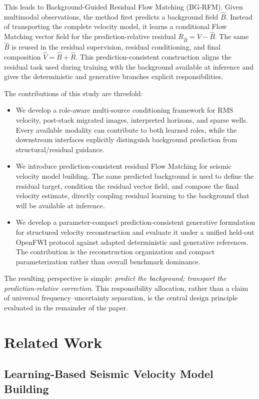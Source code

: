 \documentclass[remotesensing,article,submit,pdftex,moreauthors]{Definitions/mdpi}
\newcommand{\method}{BG-RFM}
\begin{document}
This leads to Background-Guided Residual Flow Matching (\method). Given multimodal observations, the method first predicts a background field $\hat B$. Instead of transporting the complete velocity model, it learns a conditional Flow Matching vector field for the prediction-relative residual $R_{\hat B}=V-\hat B$. The same $\hat B$ is reused in the residual supervision, residual conditioning, and final composition $\hat V=\hat B+\hat R$. This prediction-consistent construction aligns the residual task used during training with the background available at inference and gives the deterministic and generative branches explicit responsibilities.

The contributions of this study are threefold:
\begin{itemize}
    \item We develop a role-aware multi-source conditioning framework for RMS velocity, post-stack migrated images, interpreted horizons, and sparse wells. Every available modality can contribute to both learned roles, while the downstream interfaces explicitly distinguish background prediction from structural/residual guidance.
    \item We introduce prediction-consistent residual Flow Matching for seismic velocity model building. The same predicted background is used to define the residual target, condition the residual vector field, and compose the final velocity estimate, directly coupling residual learning to the background that will be available at inference.
    \item We develop a parameter-compact prediction-consistent generative formulation for structured velocity reconstruction and evaluate it under a unified held-out OpenFWI protocol against adapted deterministic and generative references. The contribution is the reconstruction organization and compact parameterization rather than overall benchmark dominance.
\end{itemize}

The resulting perspective is simple: \emph{predict the background; transport the prediction-relative correction}. This responsibility allocation, rather than a claim of universal frequency--uncertainty separation, is the central design principle evaluated in the remainder of the paper.

\section{Related Work}

\subsection{Learning-Based Seismic Velocity Model Building}
\end{document}
